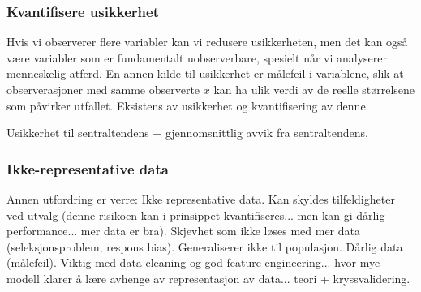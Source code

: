 \subsubsection{Kvantifisere usikkerhet}
Hvis vi observerer flere variabler kan vi redusere usikkerheten, men det kan også være variabler som er fundamentalt uobserverbare, spesielt når vi analyserer menneskelig atferd. En annen kilde til usikkerhet er målefeil i variablene, slik at observerasjoner med samme observerte $x$ kan ha ulik verdi av de reelle størrelsene som påvirker utfallet. Eksistens av usikkerhet og kvantifisering av denne.

Usikkerhet til sentraltendens + gjennomsnittlig avvik fra sentraltendens.
\subsubsection{Ikke-representative data}
Annen utfordring er verre: Ikke representative data. Kan skyldes tilfeldigheter ved utvalg (denne risikoen kan i prinsippet kvantifiseres... men kan gi dårlig performance... mer data er bra). Skjevhet som ikke løses med mer data (seleksjonsproblem, respons bias). Generaliserer ikke til populasjon. Dårlig data (målefeil). Viktig med data cleaning og god feature engineering... hvor mye modell klarer å lære avhenge av representasjon av data... teori + kryssvalidering. 
